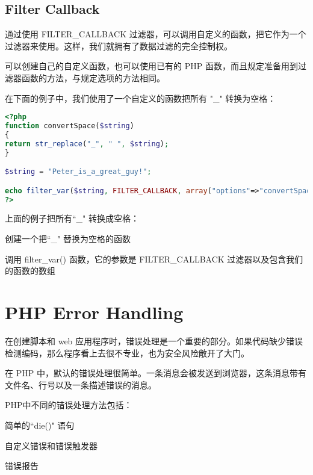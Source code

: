 \section{Filter Callback}


通过使用 FILTER\_CALLBACK 过滤器，可以调用自定义的函数，把它作为一个过滤器来使用。这样，我们就拥有了数据过滤的完全控制权。

可以创建自己的自定义函数，也可以使用已有的 PHP 函数，而且规定准备用到过滤器函数的方法，与规定选项的方法相同。

在下面的例子中，我们使用了一个自定义的函数把所有 "\_" 转换为空格：

\begin{lstlisting}[language=PHP]
<?php
function convertSpace($string)
{
return str_replace("_", " ", $string);
}

$string = "Peter_is_a_great_guy!";

echo filter_var($string, FILTER_CALLBACK, array("options"=>"convertSpace"));
?>
\end{lstlisting}


上面的例子把所有``\_" 转换成空格：

\begin{compactenum}
\item 创建一个把``\_" 替换为空格的函数
\item 调用 filter\_var() 函数，它的参数是 FILTER\_CALLBACK 过滤器以及包含我们的函数的数组
\end{compactenum}



\chapter{PHP Error Handling}

在创建脚本和 web 应用程序时，错误处理是一个重要的部分。如果代码缺少错误检测编码，那么程序看上去很不专业，也为安全风险敞开了大门。

在 PHP 中，默认的错误处理很简单。一条消息会被发送到浏览器，这条消息带有文件名、行号以及一条描述错误的消息。

PHP中不同的错误处理方法包括：

\begin{compactitem}
\item 简单的``die()" 语句
\item 自定义错误和错误触发器
\item 错误报告
\end{compactitem}






